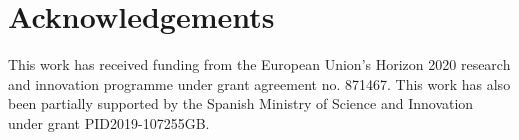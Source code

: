 \documentclass[conference,a4paper,10pt]{IEEEtran}
\begin{document}









\section*{Acknowledgements}
This work has received funding from the European Union's Horizon 2020 research and innovation programme under grant agreement no. 871467. 
This work has also been partially supported by the Spanish Ministry of Science and Innovation under grant PID2019-107255GB.




\end{document}
